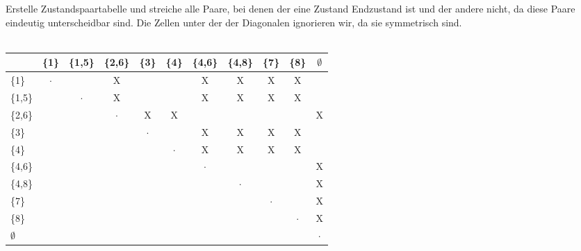 \documentclass[11pt]{article}
\begin{document}
Erstelle Zustandspaartabelle und streiche alle Paare, bei denen der eine Zustand Endzustand ist und der andere nicht, da diese Paare eindeutig unterscheidbar sind. Die Zellen unter der der Diagonalen ignorieren wir, da sie symmetrisch sind.\\ \ \\
\begin{tabular}[h]{l|c|c|c|c|c|c|c|c|c|c}
 	&\{1\} &\{1,5\} &\{2,6\} &\{3\} &\{4\} &\{4,6\} &\{4,8\} &\{7\} &\{8\} &$\emptyset$\\
\hline
 \{1\} & $\cdot$ & &X& & &X&X&X&X& \\
\hline
\{1,5\}& & $\cdot$ &X& & &X&X&X&X& \\
\hline
\{2,6\}& & & $\cdot$ &X&X& & & & &X\\
\hline
 \{3\} & & & & $\cdot$ & &X&X&X&X& \\
\hline
 \{4\} & & & & & $\cdot$ &X&X&X&X& \\
\hline
\{4,6\}& & & & & & $\cdot$ & & & &X\\
\hline
\{4,8\}& & & & & & & $\cdot$ & & &X\\
\hline
 \{7\} & & & & & & & & $\cdot$ & &X\\
\hline
 \{8\} & & & & & & & & & $\cdot$ &X\\
\hline
$\emptyset$& & & & & & & & & & $\cdot$\\
\end{tabular}
\\ \ \\
\end{document}

